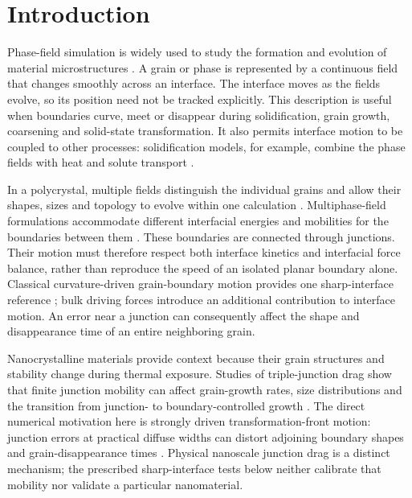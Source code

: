 \section{Introduction}
Phase-field simulation is widely used to study the formation and evolution of material microstructures \citep{moelans2008,tourret2022}. A grain or phase is represented by a continuous field that changes smoothly across an interface. The interface moves as the fields evolve, so its position need not be tracked explicitly. This description is useful when boundaries curve, meet or disappear during solidification, grain growth, coarsening and solid-state transformation. It also permits interface motion to be coupled to other processes: solidification models, for example, combine the phase fields with heat and solute transport \citep{boettinger2002}.

In a polycrystal, multiple fields distinguish the individual grains and allow their shapes, sizes and topology to evolve within one calculation \citep{krill2002}. Multiphase-field formulations accommodate different interfacial energies and mobilities for the boundaries between them \citep{steinbach1996,steinbach1999,steinbach2009}. These boundaries are connected through junctions. Their motion must therefore respect both interface kinetics and interfacial force balance, rather than reproduce the speed of an isolated planar boundary alone. Classical curvature-driven grain-boundary motion provides one sharp-interface reference \citep{mullins1956}; bulk driving forces introduce an additional contribution to interface motion. An error near a junction can consequently affect the shape and disappearance time of an entire neighboring grain.

Nanocrystalline materials provide context because their grain structures and stability change during thermal exposure. Studies of triple-junction drag show that finite junction mobility can affect grain-growth rates, size distributions and the transition from junction- to boundary-controlled growth \citep{johnson2014,miyoshi2026}. The direct numerical motivation here is strongly driven transformation-front motion: junction errors at practical diffuse widths can distort adjoining boundary shapes and grain-disappearance times \citep{hoffrogge2025}. Physical nanoscale junction drag is a distinct mechanism; the prescribed sharp-interface tests below neither calibrate that mobility nor validate a particular nanomaterial.

